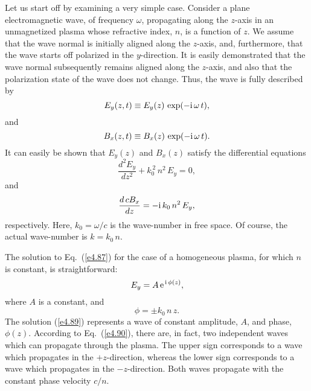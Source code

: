 Let us start off by examining  a very simple case. Consider a plane 
electromagnetic wave,
of frequency $\omega$, propagating along the $z$-axis in an unmagnetized plasma
whose refractive index, $n$, is a function of $z$. We assume that
the wave normal is initially aligned along the $z$-axis, and, furthermore,  that
the wave starts off polarized in the $y$-direction. It is
easily demonstrated that the wave normal subsequently remains aligned along
the $z$-axis, and also that the polarization
state of the wave does not change.
Thus, the wave is fully described by 
\begin{equation}
E_y(z,t) \equiv E_y(z)\,\exp(-{\rm i}\,\omega\,t),
\end{equation}
and
\begin{equation}
B_x(z,t) \equiv B_x(z)\,\exp(-{\rm i}\,\omega\,t).
\end{equation}
It can easily be shown that $E_y(z)$ and $B_x(z)$ satisfy
the differential equations
\begin{equation}\label{e4.87}
\frac{d^2 E_y}{dz^2} + k_0^{~2}\,n^2\,E_y = 0,
\end{equation}
and
\begin{equation}\label{e4.88}
\frac{d\,cB_x}{dz} = -{\rm i}\,k_0\,n^2\,E_y,
\end{equation}
respectively. Here, $k_0=\omega/c$ is the wave-number 
in free space. Of course, the actual wave-number is $k=k_0\,n$. 

The solution to Eq.~(\ref{e4.87}) for the case of a homogeneous plasma, for which
$n$ is  constant, is straightforward:
\begin{equation}\label{e4.89}
E_y = A\,{\rm e}^{\,{\rm i}\,\phi(z)},
\end{equation}
where $A$ is a constant, and
\begin{equation}\label{e4.90}
\phi = \pm k_0\,n\,z.
\end{equation}
 The solution (\ref{e4.89})
represents a  wave of constant amplitude, $A$, and phase, $\phi(z)$. According to 
Eq.~(\ref{e4.90}),
there are, in fact, two independent waves which can propagate through the plasma.
The upper sign corresponds to a wave which propagates in the $+z$-direction,
whereas  the lower sign corresponds to a wave which propagates in the
$-z$-direction. Both waves propagate with the constant phase velocity $c/n$. 

